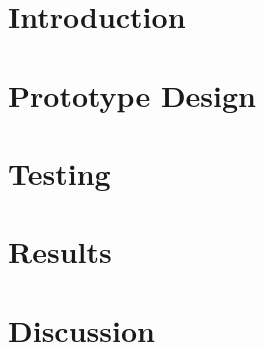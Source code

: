 \documentclass[12pt,twoside]{article}
\begin{document}
%

    



\section{Introduction}

\newpage

\section{Prototype Design}

\newpage

\section{Testing}

\newpage

\section{Results}

\newpage

\section{Discussion}

\newpage



\end{document}
